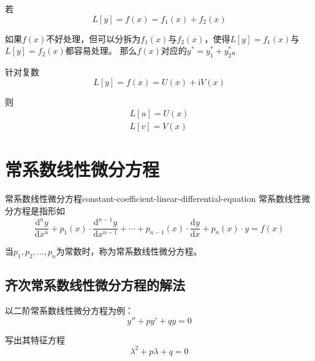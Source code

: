 \documentclass[math]{amznotes}
\begin{document}
若\begin{equation*}
  L[y] = f(x) = f_1(x) + f_2(x)
\end{equation*}

如果$f(x)$不好处理，但可以分拆为$f_1(x)$与$f_2(x)$，使得$L[y] = f_1(x)$与$L[y] = f_2(x)$都容易处理。
那么$f(x)$对应的$y^* = y_1^* + y_2^*$。

针对复数\begin{equation*}
  L[y] = f(x) = U(x) + \mathrm{i} V(x)
\end{equation*}

则\begin{gather*}
  L[u] = U(x) \\
  L[v] = V(x)
\end{gather*}
\section{常系数\textbf{线性}微分方程}
\begin{dfnbox}
{常系数线性微分方程}{constant-coefficient-linear-differential-equation}
    常系数线性微分方程是指形如
\begin{equation*}
    \dfrac{\mathrm{d}^n y}{\mathrm{d}x^n} + p_1(x) \cdot \dfrac{\mathrm{d}^{n-1} y}{\mathrm{d}x^{n-1}} + \cdots + p_{n - 1}(x) \cdot \dfrac{\mathrm{d} y}{\mathrm{d}x} + p_n(x) \cdot y = f(x)
\end{equation*}

当$p_1, p_2, \ldots, p_n$为常数时，称为常系数线性微分方程。
\end{dfnbox}
\subsection{齐次常系数线性微分方程的解法}
以二阶常系数线性微分方程为例：
\begin{equation*}
    y'' + py' + qy = 0
\end{equation*}

写出其特征方程
\begin{equation*}
    \lambda^2 + p\lambda + q = 0
\end{equation*}
\end{document}
